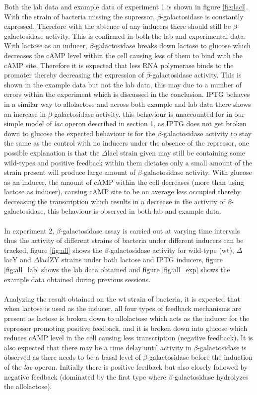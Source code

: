 \documentclass{article}
\begin{document}
Both the lab data and example data of experiment 1 is shown in figure \ref{fig:lacl}. With the strain of bacteria missing the supressor, $\beta$-galactosidase is constantly expressed. Therefore with the absence of any inducers there should still be $\beta$-galactosidase activity. This is confirmed in both the lab and experimental data. With lactose as an inducer, $\beta$-galactosidase breaks down lactose to glucose which decreases the cAMP level within the cell causing less of them to bind with the cAMP site. Therefore it is expected that less RNA polymerase binds to the promoter thereby decreasing the expression of $\beta$-galactosidase activity. This is shown in the example data but not the lab data, this may due to a number of errors within the experiment which is discussed in the conclusion. IPTG behaves in a similar way to allolactose and across both example and lab data there shows an increase in $\beta$-galactosidase activity, this behaviour is unaccounted for in our simple model of \textit{lac} operon described in section 1, as IPTG does not get broken down to glucose the expected behaviour is for the $\beta$-galactosidase activity to stay the same as the control with no inducers under the absence of the repressor, one possible explanation is that the $\Delta$lacl strain given may still be containing some wild-types and positive feedback within them dictates only a small amount of the strain present will produce large amount of $\beta$-galactosidase activity. With glucose as an inducer, the amount of cAMP within the cell decreases (more than using lactose as inducer), causing cAMP site to be on average less occupied thereby decreasing the transcription which results in a decrease in the activity of $\beta$-galactosidase, this behaviour is observed in both lab and example data.\\ \\
In experiment 2, $\beta$-galactosidase assay is carried out at varying time intervals thus the activity of different strains of bacteria under different inducers can be tracked, figure \ref{fig:all} shows the $\beta$-galactosidase activity for wild-type (wt), $\Delta$lacY and $\Delta$laclZY strains under both lactose and IPTG inducers, figure \ref{fig:all_lab} shows the lab data obtained and figure \ref{fig:all_exp} shows the example data obtained during previous sessions.\\ \\
Analyzing the result obtained on the wt strain of bacteria, it is expected that when lactose is used as the inducer, all four types of feedback mechanisms are present as lactose is broken down to allolactose which acts as the inducer for the repressor promoting positive feedback, and it is broken down into glucose which reduces cAMP level in the cell causing less transcription (negative feedback). It is also expected that there may be a time delay until activity in $\beta$-galactosidase is observed as there needs to be a basal level of $\beta$-galactosidase before the induction of the \textit{lac} operon. Initially there is positive feedback but also closely followed by negative feedback (dominated by the first type where $\beta$-galactosidase hydrolyzes the allolactose).
\end{document}
